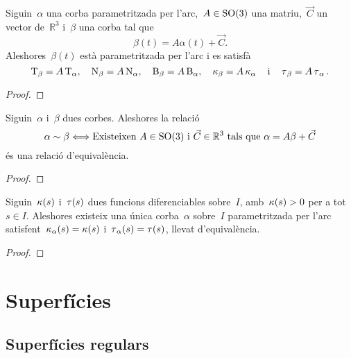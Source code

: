 \documentclass[../../main.tex]{subfiles}
\begin{document}
    \begin{corollary}
        \label{cor:una-corba-parametritzada-per-larc-i-la-seva-imatge-per-una-aplicacio-que-conserva-les-distancies-son-equivalents}
        Siguin~\(\alpha\) una corba parametritzada per l'arc,~\(A\in\operatorname{SO}(3)\) una matriu,~\(\vec{C}\) un vector de~\(\mathbb{R}^{3}\) i~\(\beta\) una corba tal que
        \[
            \beta(t)=A\alpha(t)+\vec{C}.
        \]
        Aleshores~\(\beta(t)\) està parametritzada per l'arc i es satisfà
        \[
            \operatorname{T}_{\beta}=A\operatorname{T}_{\alpha},\quad\operatorname{N}_{\beta}=A\operatorname{N}_{\alpha},\quad\operatorname{B}_{\beta}=A\operatorname{B}_{\alpha},\quad\operatorname{\kappa}_{\beta}=A\operatorname{\kappa}_{\alpha}\quad\text{i}\quad\operatorname{\tau}_{\beta}=A\operatorname{\tau}_{\alpha}.
        \]
    \end{corollary}
    \begin{proof}
    \end{proof}
    \begin{lemma}
        \label{lemma:Teorema-Fonamental-de-la-teoria-local-de-corbes}
        Siguin~\(\alpha\) i~\(\beta\) dues corbes.
        Aleshores la relació
        \[
            \alpha\sim\beta \Longleftrightarrow \text{Existeixen }A\in\operatorname{SO}(3)\text{ i }\vec{C}\in\mathbb{R}^{3}\text{ tals que }\alpha=A\beta+\vec{C}
        \]
        és una relació d'equivalència.
    \end{lemma}
    \begin{proof}
    \end{proof}
    \begin{theorem}
        \label{thm:Teorema-Fonamental-de-la-teoria-local-del-corbes}
        Siguin~\(\operatorname{\kappa}(s)\) i~\(\operatorname{\tau}(s)\) dues funcions diferenciables sobre~\(I\), amb~\(\operatorname{\kappa}(s)>0\) per a tot~\(s\in I\).
        Aleshores existeix una única corba~\(\alpha\) sobre~\(I\) parametritzada per l'arc satisfent~\(\operatorname{\kappa}_{\alpha}(s)=\operatorname{\kappa}(s)\) i~\(\operatorname{\tau}_{\alpha}(s)=\operatorname{\tau}(s)\), llevat d'equivalència.
    \end{theorem}
    \begin{proof}
    \end{proof}
\chapter{Superfícies}
\section{Superfícies regulars}
\end{document}
